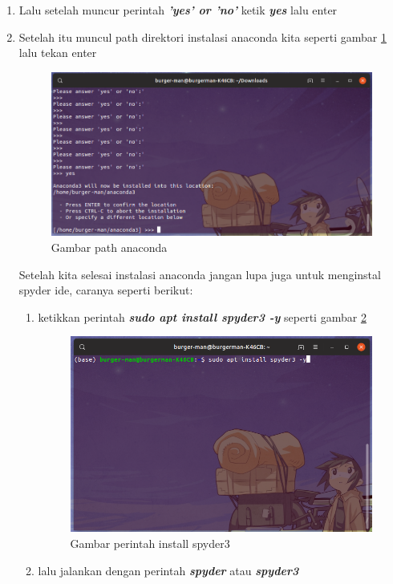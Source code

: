 \begin{enumerate}
\item Lalu setelah muncur perintah \textbf{\textit{'yes' or 'no'}} ketik \textbf{\textit{yes}} lalu enter

\item Setelah itu muncul path direktori instalasi anaconda kita seperti gambar \ref{enterpath} lalu tekan enter
\begin{figure}[H]
\centering
\includegraphics[width=1\textwidth]{figures/ubuntu/enterpath.png}
\caption{Gambar path anaconda}
\label{enterpath}
\end{figure}

Setelah kita selesai instalasi anaconda jangan lupa juga untuk menginstal spyder ide, caranya seperti berikut:
\begin{enumerate}

\item ketikkan perintah \textbf{\textit{sudo apt install spyder3 -y}} seperti gambar \ref{installspyder3}
\begin{figure}[H]
\centering
\includegraphics[width=1\textwidth]{figures/ubuntu/installspyder3.png}
\caption{Gambar perintah install spyder3}
\label{installspyder3}
\end{figure}

\item lalu jalankan dengan perintah \textbf{\textit{spyder}} atau \textbf{\textit{spyder3}}
\end{enumerate}

\end{enumerate}

